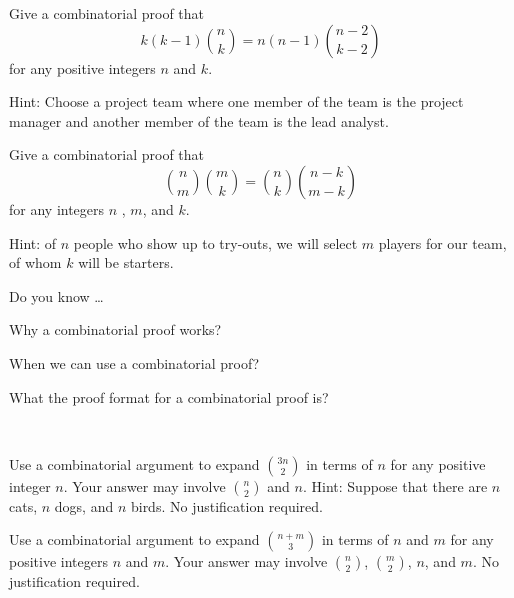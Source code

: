 \begin{exer} 
\label{exer_chair_secretary}
    Give a combinatorial proof that
    $$\displaystyle k(k-1)\binom{n}{k} = n(n-1)\binom{n-2}{k-2}$$ 
    for any positive integers $n$ and $k$. 
    
    Hint: Choose a project team where one member of the team is the project manager and another member of the team is the lead analyst. 
\end{exer}

\begin{exer} [\exerU] %
\label{exer_team_starter}
    Give a combinatorial proof that 
    $$\displaystyle \binom{n}{m}\binom{m}{k}=\binom{n}{k}\binom{n-k}{m-k}$$
    for any integers $n$ , $m$, and $k$. 
    
    Hint:  of $n$ people who show up to try-outs, we will select $m$ players for our team, of whom $k$ will be starters.
\end{exer}

\begin{exer}[\exerR] %
\label{exer_dyk_pff_comb_pf}
    Do you know \ldots
        \begin{exerpart}
            \item Why a combinatorial proof works?
            \item When we can use a combinatorial proof?
            \item What the proof format for a combinatorial proof is?
        \end{exerpart}
\end{exer}

\begin{exer} [\exerE] %
\label{exer_expand_binomial_coeffs}
~
    \begin{exerpart}
        \item Use a combinatorial argument to expand $\displaystyle \binom{3n}{2}$ in terms of $n$ for any positive integer $n$. Your answer may involve $\binom{n}{2}$ and $n$. Hint: Suppose that there are $n$ cats, $n$ dogs, and $n$ birds.  No justification required.
        
        \item Use a combinatorial argument to expand $\displaystyle \binom{n+m}{3}$ in terms of $n$ and $m$ for any positive integers $n$ and $m$. Your answer may involve $\binom{n}{2}$, $\binom{m}{2}$, $n$, and $m$. No justification required.  
    \end{exerpart}
\end{exer}


